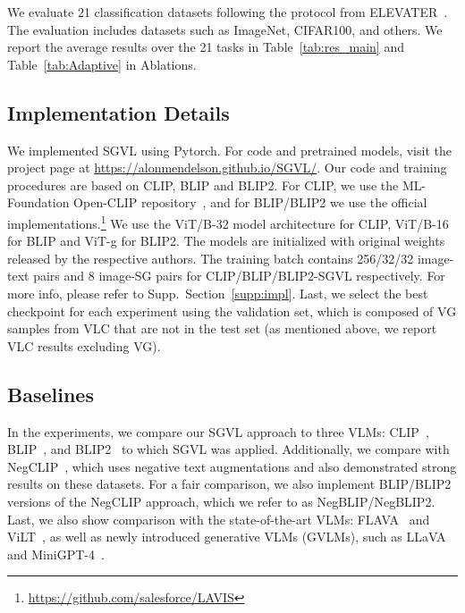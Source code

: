 \documentclass[11pt]{article}
\def\Secref#1{Section~\ref{#1}}
\newcommand{\minisection}[1]{\noindent{\textbf{#1}.}}
\newcommand{\tabref}[1]{Table~\ref{#1}}
\newcommand{\smodel}{SGVL}
\def\Secref#1{Section~\ref{#1}}
\newcommand\cmr[1]{{#1}}
\begin{document}
\minisection{Zero-Shot (ZS) Classification} We evaluate 21 classification datasets following the protocol from ELEVATER~\cite{elevater}. The evaluation includes datasets such as ImageNet, CIFAR100, and others. We report the average results over the 21 tasks in \tabref{tab:res_main} and \tabref{tab:Adaptive} in Ablations.

\subsection{Implementation Details}
\label{sec:expr:impl}
We implemented {\smodel} using Pytorch. \cmr{For code and pretrained models, visit the project page at \url{https://alonmendelson.github.io/SGVL/}.} Our code and training procedures are based on CLIP, BLIP and BLIP2. For CLIP, we use the ML-Foundation Open-CLIP repository~\cite{openclip}, and for BLIP/BLIP2 we use the official implementations.\footnote{\url{https://github.com/salesforce/LAVIS}} We use the ViT/B-32 model architecture for CLIP, ViT/B-16 for BLIP and ViT-g for BLIP2. The models are initialized with original weights released by the respective authors. The training batch contains 256/32/32 image-text pairs and 8 image-SG pairs for CLIP/BLIP/BLIP2-SGVL respectively. For more info, please refer to Supp.~\Secref{supp:impl}. Last, we select the best checkpoint for each experiment using the validation set, which is composed of VG samples from VLC that are not in the test set (as mentioned above, we report VLC results excluding VG).


\subsection{Baselines}
\label{sec:expr:baselines} 
In the experiments, we compare our {\smodel} approach to three VLMs: CLIP~\cite{radford2021learning}, BLIP~\cite{blip}, and BLIP2~\cite{li2023blip2} to which {\smodel} was applied. Additionally, we compare with NegCLIP~\cite{yuksekgonul2023when}, which uses negative text augmentations and also demonstrated strong results on these datasets. For a fair comparison, we also implement BLIP/BLIP2 versions of the NegCLIP approach, which we refer to as NegBLIP/NegBLIP2. \cmr{Last, we also show comparison with the state-of-the-art VLMs: FLAVA~\cite{Singh2021FLAVAAF} and ViLT~\cite{vilt}, as well as newly introduced generative VLMs (GVLMs), such as LLaVA~\cite{liu2023llava} and MiniGPT-4~\cite{zhu2023minigpt}.}
\end{document}
